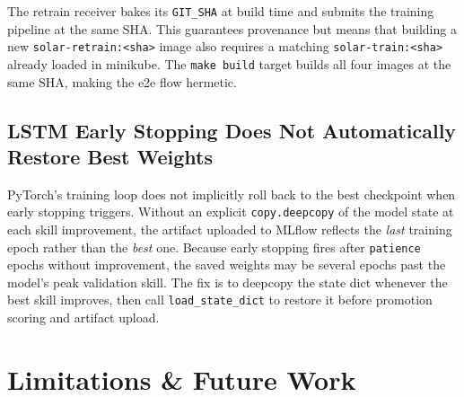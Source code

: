 \documentclass[11pt,a4paper]{article}
\begin{document}
The retrain receiver bakes its \texttt{GIT\_SHA} at build time and submits the training pipeline at the same SHA. This guarantees provenance but means that building a new \texttt{solar-retrain:<sha>} image also requires a matching \texttt{solar-train:<sha>} already loaded in minikube. The \texttt{make build} target builds all four images at the same SHA, making the e2e flow hermetic.

\subsection{LSTM Early Stopping Does Not Automatically Restore Best Weights}

PyTorch's training loop does not implicitly roll back to the best checkpoint when early stopping triggers. Without an explicit \texttt{copy.deepcopy} of the model state at each skill improvement, the artifact uploaded to MLflow reflects the \emph{last} training epoch rather than the \emph{best} one. Because early stopping fires after \texttt{patience} epochs without improvement, the saved weights may be several epochs past the model's peak validation skill. The fix is to deepcopy the state dict whenever the best skill improves, then call \texttt{load\_state\_dict} to restore it before promotion scoring and artifact upload.

\section{Limitations \& Future Work}
\end{document}
